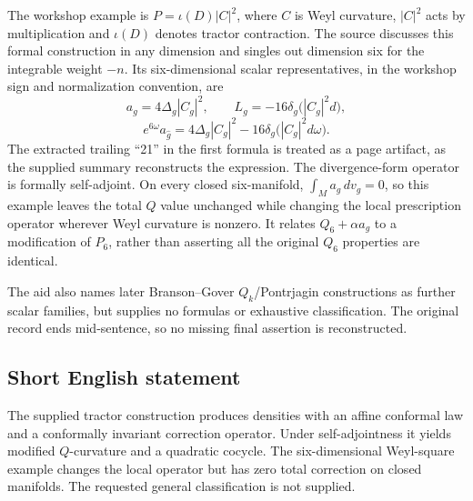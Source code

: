 \documentclass[11pt]{article}
\begin{document}
The workshop example is \(P=\iota(D)|C|^2\), where \(C\) is Weyl curvature, \(|C|^2\) acts by multiplication and \(\iota(D)\) denotes tractor contraction. The source discusses this formal construction in any dimension and singles out dimension six for the integrable weight \(-n\). Its six-dimensional scalar representatives, in the workshop sign and normalization convention, are
\[
 a_g=4\Delta_g|C_g|^2,\qquad
 L_g=-16\delta_g\bigl(|C_g|^2d\bigr),
\]
\[
 e^{6\omega}a_{\widehat g}
 =4\Delta_g|C_g|^2-16\delta_g\bigl(|C_g|^2d\omega\bigr).
\]
The extracted trailing ``21'' in the first formula is treated as a page artifact, as the supplied summary reconstructs the expression. The divergence-form operator is formally self-adjoint. On every closed six-manifold,
\(\int_M a_g\,dv_g=0\), so this example leaves the total \(Q\) value unchanged while changing the local prescription operator wherever Weyl curvature is nonzero. It relates \(Q_6+\alpha a_g\) to a modification of \(P_6\), rather than asserting all the original \(Q_6\) properties are identical.

The aid also names later Branson--Gover \(Q_k\)/Pontrjagin constructions as further scalar families, but supplies no formulas or exhaustive classification. The original record ends mid-sentence, so no missing final assertion is reconstructed.
\subsection{Short English statement}
The supplied tractor construction produces densities with an affine conformal law and a conformally invariant correction operator. Under self-adjointness it yields modified \(Q\)-curvature and a quadratic cocycle. The six-dimensional Weyl-square example changes the local operator but has zero total correction on closed manifolds. The requested general classification is not supplied.
\end{document}
